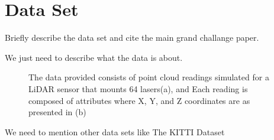\section{Data Set}

Briefly describe the data set and cite the main grand challange paper. 

We just need to describe what the data is about. 

\begin{figure}%
	\centering
	\qquad
	\caption{The data provided consists of point cloud readings simulated for a LiDAR sensor that mounts 64 lasers(a), and Each reading is composed of attributes where X, Y, and Z coordinates are as presented in (b)}%
	\label{fig:data_overview}%
\end{figure}


\cite{DEBSGC2019}



We need to mention other data sets like The KITTI Dataset \cite{Geiger2013IJRR}